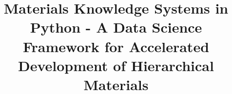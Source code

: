 \documentclass{bmcart}
\begin{document}
\begin{frontmatter}

\begin{fmbox}



\title{Materials Knowledge Systems in Python - A Data Science Framework for Accelerated Development of Hierarchical Materials}



\author[
   addressref={aff1},                   
   email={davidbrough.net}   %
]{ }
\author[
   addressref={aff2},
   email={http://wd15.github.io/about}
]{ }
\author[
   addressref={aff1,aff3},
   corref={aff1},  
   email={surya.kalidindi@me.gatech.edu}
]{ }



\end{fmbox}
\end{frontmatter}
\end{document}
